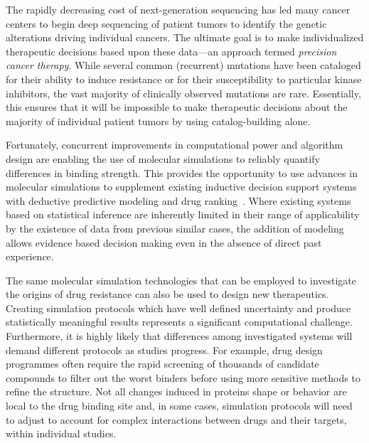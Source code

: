 The rapidly decreasing cost of next-generation sequencing has led many cancer
centers to begin deep sequencing of patient tumors to identify the genetic
alterations driving individual cancers. The ultimate goal is to make
individualized therapeutic decisions based upon these data---an approach
termed \textit{precision cancer therapy}. While several common (recurrent)
mutations have been cataloged for their ability to induce resistance or for
their susceptibility to particular kinase inhibitors, the vast majority of
clinically observed mutations are rare. Essentially, this ensures that it
will be impossible to make therapeutic decisions about the majority of
individual patient tumors by using catalog-building alone.

Fortunately, concurrent improvements in computational power and algorithm
design are enabling the use of molecular simulations to reliably quantify
differences in binding strength. This provides the opportunity to use advances
in molecular simulations to supplement existing inductive decision support
systems with deductive predictive modeling and drug ranking~\cite{Marias2011,
Sloot2009}. Where existing systems based on statistical inference are
inherently limited in their range of applicability by the existence of data
from previous similar cases, the addition of modeling allows evidence based
decision making even in the absence of direct past experience.


The same molecular simulation technologies that can be employed to
investigate the origins of drug resistance can also be used to design new
therapeutics. Creating simulation protocols which 
have well defined uncertainty and produce
statistically meaningful results represents a significant
computational challenge. Furthermore, it is highly likely that differences
among %
investigated systems %
will demand different protocols
as studies progress. For example, %
drug design programmes %
often require the rapid screening of thousands of candidate compounds to filter
out the worst binders before using more sensitive methods 
to refine the structure. Not all changes induced in proteins shape or
behavior are local to the drug binding site and, in some cases, simulation
protocols will need to adjust to account for complex interactions between
drugs and their targets, within individual studies.

